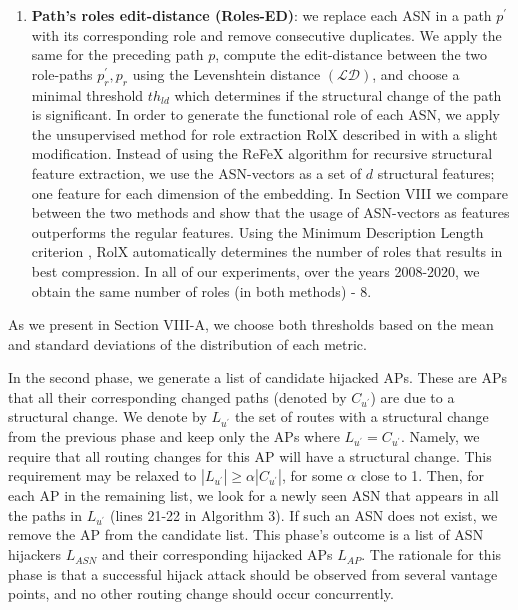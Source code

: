 \documentclass[10pt,journal]{IEEEtran}
\begin{document}
\begin{enumerate}
    \item \textbf{Path's roles edit-distance (Roles-ED)}: we replace each ASN in a path $p^{\prime}$ with its corresponding role and remove consecutive duplicates. We apply the same for the preceding path $p$, compute the edit-distance between the two role-paths $p_{r}^{\prime}, p_{r}$ using the Levenshtein distance \cite{hyyro2001explaining} $(\mathcal{LD})$, and choose a minimal threshold $th_{ld}$ which determines if the structural change of the path is significant. In order to generate the functional role of each ASN, we apply the unsupervised method for role extraction RolX described in \cite{henderson2012rolx} with a slight modification. Instead of using the ReFeX algorithm \cite{henderson2011its} for recursive structural feature extraction, we use the ASN-vectors as a set of $d$ structural features; one feature for each dimension of the embedding. In Section VIII we compare between the two methods and show that the usage of ASN-vectors as features outperforms the regular features. Using the Minimum Description Length criterion \cite{rissanen1978modeling}, RolX automatically determines the number of roles that results in best compression. In all of our experiments, over the years 2008-2020, we obtain the same number of roles (in both methods) - 8.
\end{enumerate}

As we present in Section VIII-A, we choose both thresholds based on the mean and standard deviations of the distribution of each metric.

In the second phase, we generate a list of candidate hijacked APs. These are APs that all their corresponding changed paths (denoted by $C_{u^{\prime}}$) are due to a structural change. We denote by $L_{u^{\prime}}$ the set of routes with a structural change from the previous phase and keep only the APs where $L_{u^{\prime}} = C_{u^{\prime}}$. Namely, we require that all routing changes for this AP will have a structural change. This requirement may be relaxed to $|L_{u^{\prime}}| \geq \alpha |C_{u^{\prime}}|$, for some $\alpha$ close to 1. Then, for each AP in the remaining list, we look for a newly seen ASN that appears in all the paths in $L_{u^{\prime}}$ (lines 21-22 in Algorithm 3). If such an ASN does not exist, we remove the AP from the candidate list. This phase's outcome is a list of ASN hijackers $L_{ASN}$ and their corresponding hijacked APs $L_{AP}$. The rationale for this phase is that a successful hijack attack should be observed from several vantage points, and no other routing change should occur concurrently.
\end{document}
